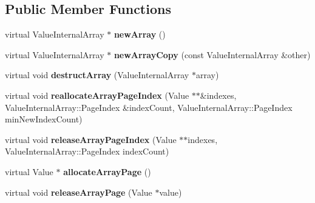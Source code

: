 \subsection*{Public Member Functions}
\begin{DoxyCompactItemize}
\item 
\hypertarget{class_default_value_array_allocator_a8689ed26ea893863259338c15d838b41}{virtual Value\-Internal\-Array $\ast$ {\bfseries new\-Array} ()}\label{class_default_value_array_allocator_a8689ed26ea893863259338c15d838b41}

\item 
\hypertarget{class_default_value_array_allocator_a2d56726cd560f97c3589026be8a65d95}{virtual Value\-Internal\-Array $\ast$ {\bfseries new\-Array\-Copy} (const Value\-Internal\-Array \&other)}\label{class_default_value_array_allocator_a2d56726cd560f97c3589026be8a65d95}

\item 
\hypertarget{class_default_value_array_allocator_adac32a54d25ee1aee7df3b19527ffb57}{virtual void {\bfseries destruct\-Array} (Value\-Internal\-Array $\ast$array)}\label{class_default_value_array_allocator_adac32a54d25ee1aee7df3b19527ffb57}

\item 
\hypertarget{class_default_value_array_allocator_a2a5376fbd5ac116ef985935e569d0492}{virtual void {\bfseries reallocate\-Array\-Page\-Index} (Value $\ast$$\ast$\&indexes, Value\-Internal\-Array\-::\-Page\-Index \&index\-Count, Value\-Internal\-Array\-::\-Page\-Index min\-New\-Index\-Count)}\label{class_default_value_array_allocator_a2a5376fbd5ac116ef985935e569d0492}

\item 
\hypertarget{class_default_value_array_allocator_a315ffaf5d7d8ca65c10f9468814866f4}{virtual void {\bfseries release\-Array\-Page\-Index} (Value $\ast$$\ast$indexes, Value\-Internal\-Array\-::\-Page\-Index index\-Count)}\label{class_default_value_array_allocator_a315ffaf5d7d8ca65c10f9468814866f4}

\item 
\hypertarget{class_default_value_array_allocator_a7b5bf432a9564dbfe5c1e8c38f54f64a}{virtual Value $\ast$ {\bfseries allocate\-Array\-Page} ()}\label{class_default_value_array_allocator_a7b5bf432a9564dbfe5c1e8c38f54f64a}

\item 
\hypertarget{class_default_value_array_allocator_a4f01eadeb6149a2417f8a7fff2e3ea6d}{virtual void {\bfseries release\-Array\-Page} (Value $\ast$value)}\label{class_default_value_array_allocator_a4f01eadeb6149a2417f8a7fff2e3ea6d}

\end{DoxyCompactItemize}


